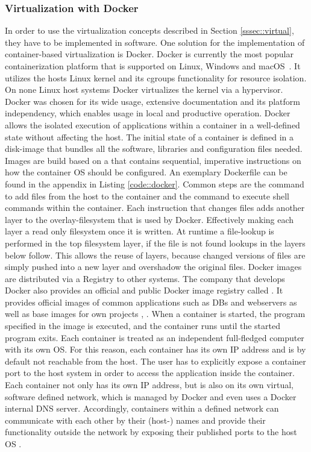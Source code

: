 \documentclass[12pt, a4paper]{article}
\begin{document}
        \subsubsection{Virtualization with Docker}\label{sssec::docker}
        In order to use the virtualization concepts described in Section \ref{sssec::virtual}, they have to be implemented in software. One solution for the implementation of container-based virtualization is Docker. Docker is currently the most popular containerization platform that is supported on Linux, Windows and macOS~\cite{docker_share}. It utilizes the hosts Linux kernel and its cgroups functionality for resource isolation. On none Linux host systems Docker virtualizes the kernel via a hypervisor. Docker was chosen for its wide usage, extensive documentation and its platform independency, which enables usage in local and productive operation.\newline
        Docker allows the isolated execution of applications within a container in a well-defined state without affecting the host. The initial state of a container is defined in a disk-image that bundles all the software, libraries and configuration files needed. Images are build based on a  that contains sequential, imperative instructions on how the container \ac{OS} should be configured. An exemplary Dockerfile can be found in the appendix in Listing \ref{code::docker}. Common steps are the  command to add files from the host to the container and the  command to execute shell commands within the container. Each instruction that changes files adds another layer to the overlay-filesystem that is used by Docker. Effectively making each layer a read only filesystem once it is written. At runtime a file-lookup is performed in the top filesystem layer, if the file is not found lookups in the layers below follow. This allows the reuse of layers, because changed versions of files are simply pushed into a new layer and overshadow the original files. Docker images are distributed via a Registry to other systems. The company that develops Docker also provides an official and public Docker image registry called . It provides official images of common applications such as \acl{DB}s and webservers as well as base images for own projects \cite{docker2020}, \cite{dockerdocs}.\newline
        When a container is started, the program specified in the image is executed, and the container runs until the started program exits. Each container is treated as an independent full-fledged computer with its own \ac{OS}. For this reason, each container has its own \acs{IP} address and is by default not reachable from the host. The user has to explicitly expose a container port to the host system in order to access the application inside the container. Each container not only has its own \acs{IP} address, but is also on its own virtual, software defined network, which is managed by Docker and even uses a Docker internal \ac{DNS} server. Accordingly, containers within a defined network can communicate with each other by their (host-) names and provide their functionality outside the network by exposing their published ports to the host \ac{OS} \cite{docker2020}.\newline
\end{document}
